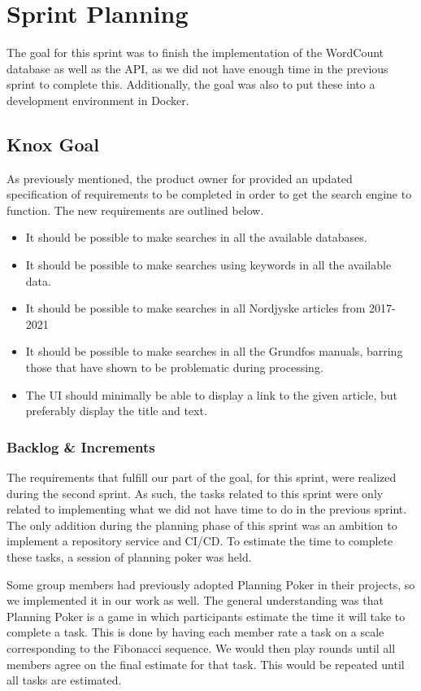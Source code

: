 \section{Sprint Planning}\label{sec:sprintPlanningSprint3}
The goal for this sprint was to finish the implementation of the WordCount database as well as the API, as we did not have enough time in the previous sprint to complete this. Additionally, the goal was also to put these into a development environment in Docker.

\subsection{Knox Goal}\label{ssec:sprint3Goal}
As previously mentioned, the product owner for \knox{} provided an updated specification of requirements to be completed in order to get the search engine to function. The new requirements are outlined below. 
\begin{itemize}
	\item It should be possible to make searches in all the available databases.
	\item It should be possible to make searches using keywords in all the available data.
	\item It should be possible to make searches in all Nordjyske articles from 2017-2021
	\item It should be possible to make searches in all the Grundfos manuals, barring those that have shown to be problematic during processing.
	\item The UI should minimally be able to display a link to the given article, but preferably display the title and text.
\end{itemize}


\subsubsection{Backlog \& Increments}
The requirements that fulfill our part of the \knox{} goal, for this sprint, were realized during the second sprint. As such, the tasks related to this sprint were only related to implementing what we did not have time to do in the previous sprint. 
The only addition during the planning phase of this sprint was an ambition to implement a repository service and CI/CD. To estimate the time to complete these tasks, a session of planning poker was held. 

Some group members had previously adopted Planning Poker in their projects, so we implemented it in our work as well. The general understanding was that Planning Poker is a game in which participants estimate the time it will take to complete a task. This is done by having each member rate a task on a scale corresponding to the Fibonacci sequence. We would then play rounds until all members agree on the final estimate for that task. This would be repeated until all tasks are estimated.

